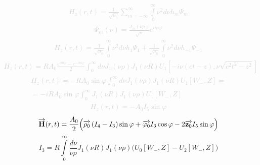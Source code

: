 %
\textcolor{lightgray} { \begin{equation*} \begin{aligned}
H_z (r,t) = \frac{1}{\sqrt{\mu_0}} \sum \limits_{m=-\infty}^{\infty}
\int \limits_0^\infty \nu^2 d \nu h_m \Psi_m
\end{aligned} \end{equation*} }
%
\textcolor{lightgray} { \begin{equation*} \begin{aligned}
\Psi_m (\nu) = \frac{J_m(\nu \rho)}{\sqrt{\nu}} e^{im \varphi} 
\end{aligned} \end{equation*} }
%
\textcolor{lightgray} { \begin{equation*} \begin{aligned}
H_z (r,t) = 
\frac{1}{\sqrt{\mu_0}} \int \limits_0^\infty \nu^2 d \nu h_{1} \Psi_{1} +
\frac{1}{\sqrt{\mu_0}} \int \limits_0^\infty \nu^2 d \nu h_{-1} \Psi_{-1}
\end{aligned} \end{equation*} }
%
\textcolor{lightgray} { \begin{equation*} \begin{aligned}
H_z (r,t) = R A_0 \frac{e^{im \varphi}-e^{-im \varphi}}{2} \int_0^\infty 
d \nu J_1(\nu \rho) J_1 (\nu R)
U_1 \left[ -i \nu (ct-z), \nu \sqrt{c^2t^2-z^2} \right]
\end{aligned} \end{equation*} }
%
\textcolor{lightgray} { \begin{equation*} \begin{aligned}
H_z (r,t) = - R A_0 \sin \varphi \int_0^\infty 
d \nu J_1(\nu \rho) J_1 (\nu R) U_1 [ W_-, Z ] = \\
= - i R A_0 \sin \varphi \int_{0}^{\infty} J_1 \left( \nu R \right)
J_1 \left( \nu \rho \right) U_1 [ W_-, Z ]
\end{aligned} \end{equation*} }
%
\textcolor{lightgray} { \begin{equation*} \begin{aligned}
H_z \left( r, t \right) = - A_0 I_5 \sin \varphi
\end{aligned} \end{equation*} }
%
\begin{equation}
\overrightarrow{\mathbf H} (r, t) = \frac{A_0}{2} \Big( 
\overrightarrow{\mathbf \rho_0} \left( I_4 - I_3 \right) \sin \varphi +
\overrightarrow{\mathbf \varphi_0} I_3 \cos \varphi -
2 \overrightarrow{\mathbf z_0} I_5 \sin \varphi \Big)
\end{equation}
%
\begin{equation*}
I_3 = R \int \limits_{0}^{\infty}
\frac{d\nu}{\nu \rho} J_1(\nu R) J_1(\nu \rho)
\Big( U_0[ W_-, Z ] - U_2[ W_-, Z ] \Big) 
\end{equation*}
